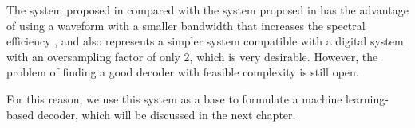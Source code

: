 The system proposed in \cite{Plabst_DD} compared with the system proposed in \cite{Tasbihi_Tukey} has the advantage of using a waveform with a smaller bandwidth that increases the spectral efficiency \cite{Plabst_DD}, and also represents a simpler system compatible with a digital system with an oversampling factor of only 2, which is very desirable. However, the problem of finding a good decoder with feasible complexity is still open. 

For this reason, we use this system as a base to formulate a machine learning-based decoder, which will be discussed in the next chapter.













